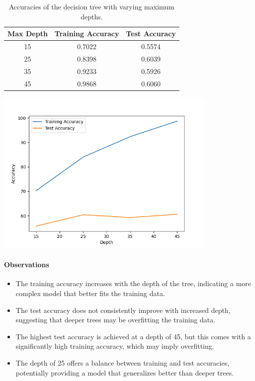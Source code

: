 \documentclass[12pt]{article}
\begin{document}
    \begin{table}[h]
\centering
\begin{tabular}{@{}ccc@{}}
\toprule
Max Depth & Training Accuracy & Test Accuracy \\ \midrule
15        & 0.7022            & 0.5574        \\
25        & 0.8398            & 0.6039        \\
35        & 0.9233            & 0.5926        \\
45        & 0.9868            & 0.6060        \\ \bottomrule
\end{tabular}
\caption{Accuracies of the decision tree with varying maximum depths.}
\end{table}

\begin{center}
    \includegraphics[width=0.8\textwidth]{Assignment 3/q1/(b)depth_vs_accuracy.png}
\end{center}

\paragraph{Observations}
\begin{itemize}
    \item The training accuracy increases with the depth of the tree, indicating a more complex model that better fits the training data.
    \item The test accuracy does not consistently improve with increased depth, suggesting that deeper trees may be overfitting the training data.
    \item The highest test accuracy is achieved at a depth of 45, but this comes with a significantly high training accuracy, which may imply overfitting.
    \item The depth of 25 offers a balance between training and test accuracies, potentially providing a model that generalizes better than deeper trees.
\end{itemize}
\end{document}
